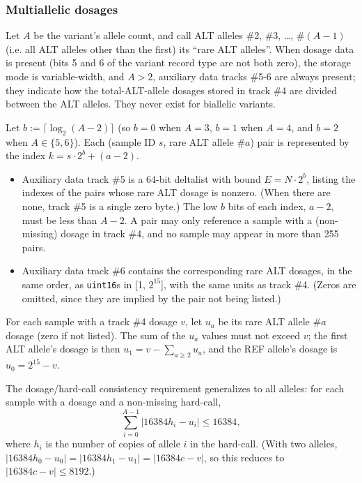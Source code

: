\documentclass[8pt]{article}
\begin{document}
\subsubsection{Multiallelic dosages}

Let $A$ be the variant's allele count, and call ALT alleles \#2, \#3, \ldots,
\#$(A-1)$ (i.e. all ALT alleles other than the first) its ``rare ALT
alleles''.  When dosage data is present (bits 5 and 6 of the variant record
type are not both zero), the storage mode is variable-width, and $A>2$,
auxiliary data tracks \#5-6 are always present; they indicate how the
total-ALT-allele dosages stored in track \#4 are divided between the ALT
alleles.  They never exist for biallelic variants.

Let $b:=\lceil \log_2 (A-2)\rceil $ (so $b=0$ when $A=3$, $b=1$ when $A=4$, and
$b=2$ when $A\in \{5,6\}$).  Each (sample ID $s$, rare ALT allele \#$a$) pair is
represented by the index $k = s\cdot 2^b + (a-2)$.

\begin{itemize}
\item Auxiliary data track \#5 is a 64-bit deltalist with bound $E=N\cdot 2^b$,
  listing the indexes of the pairs whose rare ALT dosage is nonzero.  (When
  there are none, track \#5 is a single zero byte.)  The low $b$ bits of each
  index, $a-2$, must be less than $A-2$.  A pair may only reference a sample
  with a (non-missing) dosage in track \#4, and no sample may appear in more
  than 255 pairs.
\item Auxiliary data track \#6 contains the corresponding rare ALT dosages, in
  the same order, as \texttt{uint16}s in [1, $2^{15}$], with the same units as
  track \#4.  (Zeros are omitted, since they are implied by the pair not being
  listed.)
\end{itemize}

For each sample with a track \#4 dosage $v$, let $u_a$ be its rare ALT allele
\#$a$ dosage (zero if not listed).  The sum of the $u_a$ values must not exceed
$v$; the first ALT allele's dosage is then $u_1 = v - \sum_{a\geq 2} u_a$, and
the REF allele's dosage is $u_0 = 2^{15} - v$.

The dosage/hard-call consistency requirement generalizes to all alleles: for
each sample with a dosage and a non-missing hard-call,
\[
\sum_{i=0}^{A-1} |16384 h_i - u_i| \leq 16384,
\]
where $h_i$ is the number of copies of allele $i$ in the hard-call.  (With two
alleles, $|16384h_0-u_0| = |16384h_1-u_1| = |16384c-v|$, so this reduces to
$|16384c - v|\leq 8192$.)
\end{document}

